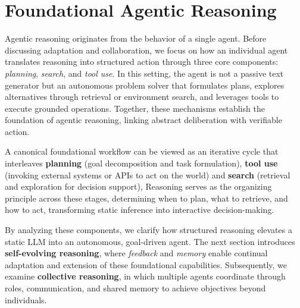 \section{Foundational Agentic Reasoning}
\label{sec:foundational}

Agentic reasoning originates from the behavior of a single agent. 
Before discussing adaptation and collaboration, we focus on how an individual agent translates reasoning into structured action through three core components: \emph{planning}, \emph{search}, and \emph{tool use}. 
In this setting, the agent is not a passive text generator but an autonomous problem solver that formulates plans, explores alternatives through retrieval or environment search, and leverages tools to execute grounded operations. 
Together, these mechanisms establish the foundation of agentic reasoning, linking abstract deliberation with verifiable action.

A canonical foundational workflow can be viewed as an iterative cycle that interleaves 
\textbf{planning} (goal decomposition and task formulation),  \textbf{tool use} (invoking external systems or APIs to act on the world) and \textbf{search} (retrieval and exploration for decision support), 
Reasoning serves as the organizing principle across these stages, determining when to plan, what to retrieve, and how to act, transforming static inference into interactive decision-making.

By analyzing these components, we clarify how structured reasoning elevates a static LLM into an autonomous, goal-driven agent. 
The next section introduces \textbf{self-evolving reasoning}, where \emph{feedback} and \emph{memory} enable continual adaptation and extension of these foundational capabilities. 
Subsequently, we examine \textbf{collective reasoning}, in which multiple agents coordinate through roles, communication, and shared memory to achieve objectives beyond individuals.








